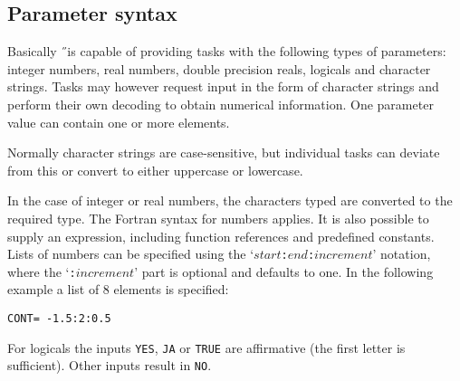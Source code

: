 \subsection{Parameter syntax}
Basically \H\ is capable of providing tasks with the following types of
parameters:
integer numbers, real numbers, double precision reals, logicals and 
character strings.
Tasks may however request input in the form of character strings and perform
their own decoding to obtain numerical information.
One parameter value can contain one or more elements.

Normally character strings are case-sensitive, but individual tasks can deviate
from this or convert to either uppercase or lowercase.

In the case of integer or real numbers, the characters typed are converted
to the required type. The Fortran syntax for numbers applies. It is also
possible to supply an expression, including function references and predefined
constants.
Lists of numbers can be specified using the 
`$start${\tt :}$end${\tt :}$increment$'
notation, where the `{\tt :}$increment$' part is optional and defaults to one.
In the following example a list of 8 elements is specified:

{\tt CONT= -1.5:2:0.5}

For logicals the inputs {\tt YES}, {\tt JA} or {\tt TRUE} 
are affirmative (the first letter is sufficient). Other inputs result in
{\tt NO}.

